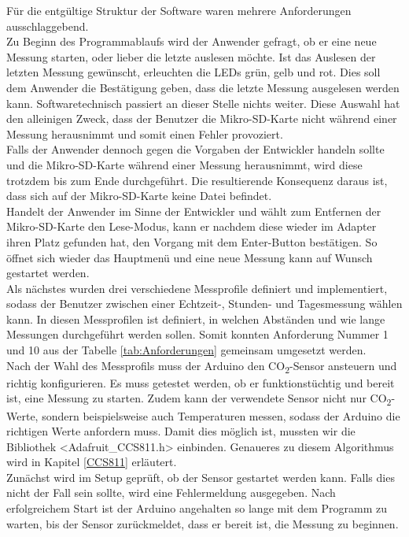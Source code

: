 \label{Softwaremplementation}



Für die entgültige Struktur der Software waren mehrere Anforderungen ausschlaggebend. \\
Zu Beginn des Programmablaufs wird der Anwender gefragt, ob er eine neue Messung starten, oder lieber die letzte auslesen möchte. Ist das Auslesen der letzten Messung gewünscht, erleuchten die LEDs grün, gelb und rot. Dies soll dem Anwender die Bestätigung geben, dass die letzte Messung ausgelesen werden kann. Softwaretechnisch passiert an dieser Stelle nichts weiter. Diese Auswahl hat den alleinigen Zweck, dass der Benutzer die Mikro-SD-Karte nicht während einer Messung herausnimmt und somit einen Fehler provoziert. \\
Falls der Anwender dennoch gegen die Vorgaben der Entwickler handeln sollte und die Mikro-SD-Karte während einer Messung herausnimmt, wird diese trotzdem bis zum Ende durchgeführt. Die resultierende Konsequenz daraus ist, dass sich auf der Mikro-SD-Karte keine Datei befindet. \\
Handelt der Anwender im Sinne der Entwickler und wählt zum Entfernen der Mikro-SD-Karte den Lese-Modus, kann er nachdem diese wieder im Adapter ihren Platz gefunden hat, den Vorgang mit dem Enter-Button bestätigen. So öffnet sich wieder das Hauptmenü und eine neue Messung kann auf Wunsch gestartet werden. \\
Als nächstes wurden drei verschiedene Messprofile definiert und implementiert, sodass der Benutzer zwischen einer Echtzeit-, Stunden- und Tagesmessung wählen kann. In diesen Messprofilen ist definiert, in welchen Abständen und wie lange Messungen durchgeführt werden sollen. Somit konnten Anforderung Nummer 1 und 10 aus der Tabelle \ref{tab:Anforderungen} gemeinsam umgesetzt werden. \\
Nach der Wahl des Messprofils muss der Arduino den CO\textsubscript{2}-Sensor ansteuern und richtig konfigurieren. Es muss getestet werden, ob er funktionstüchtig und bereit ist, eine Messung zu starten. Zudem kann der verwendete Sensor nicht nur CO\textsubscript{2}-Werte, sondern beispielsweise auch Temperaturen messen, sodass der Arduino die richtigen Werte anfordern muss. Damit dies möglich ist, mussten wir die Bibliothek <Adafruit\_CCS811.h> einbinden. Genaueres zu diesem Algorithmus wird in Kapitel \ref{CCS811} erläutert. \\
Zunächst wird im Setup geprüft, ob der Sensor gestartet werden kann. Falls dies nicht der Fall sein sollte, wird eine Fehlermeldung ausgegeben. Nach erfolgreichem Start ist der Arduino angehalten so lange mit dem Programm zu warten, bis der Sensor zurückmeldet, dass er bereit ist, die Messung zu beginnen. \\
